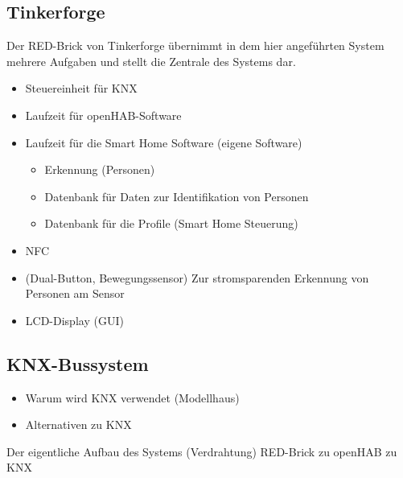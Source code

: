 \subsection{Tinkerforge}
Der RED-Brick von Tinkerforge übernimmt in dem hier angeführten System mehrere Aufgaben und stellt die Zentrale
des Systems dar. 

\begin{itemize}
\item Steuereinheit für KNX
\item Laufzeit für openHAB-Software
\item Laufzeit für die Smart Home Software (eigene Software)
	\begin{itemize}
		\item Erkennung (Personen)
		\item Datenbank für Daten zur Identifikation von Personen
		\item Datenbank für die Profile (Smart Home Steuerung)
	\end{itemize}
\end{itemize}

\begin{itemize}
	\item NFC
	\item (Dual-Button, Bewegungssensor) Zur stromsparenden Erkennung von Personen am Sensor
	\item LCD-Display (GUI)
\end{itemize}

\subsection{KNX-Bussystem}
\begin{itemize}
	\item Warum wird KNX verwendet (Modellhaus)
	\item Alternativen zu KNX
\end{itemize}
Der eigentliche Aufbau des Systems (Verdrahtung) RED-Brick zu openHAB zu KNX